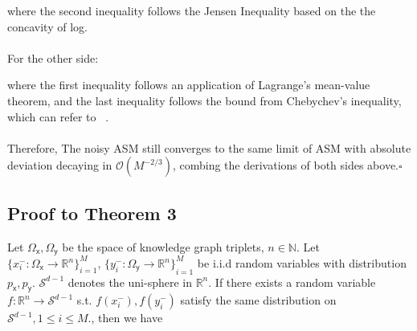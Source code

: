 \begin{pf}
\noindent where the second inequality follows the Jensen Inequality based on the the concavity of log.
\\
\\
\indent For the other side:

\noindent where the first inequality follows an application of Lagrange's mean-value theorem, and the last inequality follows the bound from Chebychev’s inequality, which can refer to ~\cite{wang2020understanding}.
\\
\\
Therefore, The noisy ASM still converges to the same limit of ASM with absolute deviation decaying in $\mathcal{O}(M^{-2/3})$, combing the derivations of both sides above.\hfill$\square$
\end{pf}


\subsection{ Proof to Theorem 3} \label{sec:proof3}

Let $\Omega_{\mathsf x}, \Omega_{\mathsf y}$ be the space of knowledge graph triplets, $n\in\mathbb{N}$. Let ${\{x^-_i:\Omega_{\mathsf x}\to\mathbb{R}^n\}}_{i=1}^M$, ${\{y^-_i:\Omega_{\mathsf y}\to\mathbb{R}^n\}}_{i=1}^M$ be i.i.d random variables with distribution $p_{\mathsf x}, p_{\mathsf y}$. $\mathcal{S}^{d-1}$ denotes the uni-sphere in $\mathbb{R}^n$. If there exists a random variable  $f:\mathbb{R}^n\to\mathcal{S}^{d-1}$ s.t. $f(x_i^-),f(y_i^-)$ satisfy the same distribution on $\mathcal{S}^{d-1}, 1\le i\le M.$, then we have 


